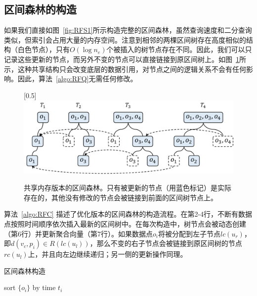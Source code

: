 \subsection{区间森林的构造}

	如果我们直接如图~\ref{fig:RFS1}所示构造完整的区间森林，虽然查询速度和二分查询类似，但索引会占用大量的内存空间。注意到相邻的两棵区间树存在高度相似的结构（白色节点），只有$O(\log n_e)$个被插入的树节点存在不同。因此，我们可以只记录这些更新的节点，而另外不变的节点可以直接链接到原区间树上。如图~\ref{fig:RFS3}所示，这种共享结构只会改变底层的数据引用，对节点之间的逻辑关系不会有任何影响。因此，算法~\ref{algo:RFQ}无需任何修改。
	
	\begin{figure}[h!]\centering
		\scalebox{0.5}[0.5]{\includegraphics{./figures/RFS_3.pdf}}
		\caption{共享内存版本的区间森林。只有被更新的节点（用蓝色标记）是实际存在的，其他没有修改的节点会被链接到前面的区间树节点上。}
		\label{fig:RFS3}
	\end{figure}

	算法~\ref{algo:RFC} 描述了优化版本的区间森林的构造流程。在第2-4行，不断有数据点按照时间顺序依次插入最新的区间树中。在每次构造中，树节点会被动态创建（第6行）并更新聚合向量（第7行）。如果数据点$o_i$将被分配到左子节点$lc(u_r)$，即$d(v_c, p_i) \in R(lc(u_l))$，那么不变的右子节点会被链接到原区间树的节点$rc(u_l)$上，并且向左边继续递归；另一侧的更新操作同理。
	
	\begin{algorithm}[h]
		\caption{区间森林构造}
		\label{algo:RFC}
		\DontPrintSemicolon
	
		sort $\{o_i\}$ by time $t_i$
		
			
			
	\end{algorithm}

